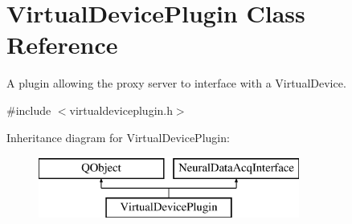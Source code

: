 \hypertarget{class_virtual_device_plugin}{\section{Virtual\-Device\-Plugin Class Reference}
\label{class_virtual_device_plugin}
}


A plugin allowing the proxy server to interface with a Virtual\-Device.  




{\ttfamily \#include $<$virtualdeviceplugin.\-h$>$}

Inheritance diagram for Virtual\-Device\-Plugin\-:\begin{figure}[H]
\begin{center}
\leavevmode
\includegraphics[height=2.000000cm]{class_virtual_device_plugin}
\end{center}
\end{figure}
